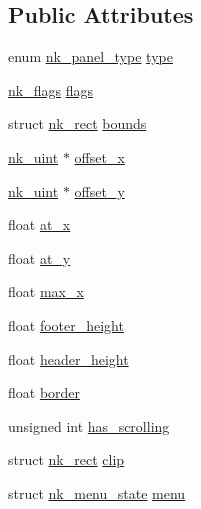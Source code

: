\subsection*{Public Attributes}
\begin{DoxyCompactItemize}
\item 
enum \mbox{\hyperlink{nuklear_8h_ae2eaaeccb136c68814c17bbc71496b99}{nk\+\_\+panel\+\_\+type}} \mbox{\hyperlink{structnk__panel_a1c0a0e1bd86b8de10026106fb96787da}{type}}
\item 
\mbox{\hyperlink{nuklear_8h_a19e0e2f6db4862891d9801de3c3da323}{nk\+\_\+flags}} \mbox{\hyperlink{structnk__panel_a611bb738010ced8097aad851ea4397f0}{flags}}
\item 
struct \mbox{\hyperlink{structnk__rect}{nk\+\_\+rect}} \mbox{\hyperlink{structnk__panel_ac959321fd621009edb4b5cc9ad8f1b17}{bounds}}
\item 
\mbox{\hyperlink{nuklear_8h_a951b598a3101b6d2a55d22ac39f57919}{nk\+\_\+uint}} $\ast$ \mbox{\hyperlink{structnk__panel_a2aced4e49f290e87ed6c2823122d946c}{offset\+\_\+x}}
\item 
\mbox{\hyperlink{nuklear_8h_a951b598a3101b6d2a55d22ac39f57919}{nk\+\_\+uint}} $\ast$ \mbox{\hyperlink{structnk__panel_a6704d6eb0414bdeaf9cba1facdb4c729}{offset\+\_\+y}}
\item 
float \mbox{\hyperlink{structnk__panel_a9479cf50da71987fe268685af6b59c54}{at\+\_\+x}}
\item 
float \mbox{\hyperlink{structnk__panel_a35aa7e42a81f41b7b274b653c10bbc06}{at\+\_\+y}}
\item 
float \mbox{\hyperlink{structnk__panel_ae5077b921e52862b991798c89ec1c12a}{max\+\_\+x}}
\item 
float \mbox{\hyperlink{structnk__panel_ac206a493d6ac30679e44abc7bfc84db5}{footer\+\_\+height}}
\item 
float \mbox{\hyperlink{structnk__panel_afd450a3ec4982561df129e6ef610efc8}{header\+\_\+height}}
\item 
float \mbox{\hyperlink{structnk__panel_a18d808e6efd65f6ae8b6c35ac8e12541}{border}}
\item 
unsigned int \mbox{\hyperlink{structnk__panel_ab2de8d754a7f2cc3f8aea0aa0cd838e9}{has\+\_\+scrolling}}
\item 
struct \mbox{\hyperlink{structnk__rect}{nk\+\_\+rect}} \mbox{\hyperlink{structnk__panel_a6312d12ff73c92d1514429bb16cd43d2}{clip}}
\item 
struct \mbox{\hyperlink{structnk__menu__state}{nk\+\_\+menu\+\_\+state}} \mbox{\hyperlink{structnk__panel_a328ce831e11cefc6308d1dcb0c124771}{menu}}

\end{DoxyCompactItemize}
